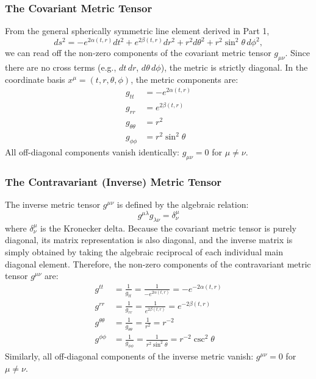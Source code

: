 \documentclass[11pt, a4paper]{report}
\begin{document}
\subsubsection*{The Covariant Metric Tensor}
From the general spherically symmetric line element derived in Part 1,
\begin{equation}
    ds^2 = -e^{2\alpha(t,r)} dt^2 + e^{2\beta(t,r)} dr^2 + r^2 d\theta^2 + r^2 \sin^2\theta \, d\phi^2,
\end{equation}
we can read off the non-zero components of the covariant metric tensor $g_{\mu\nu}$. Since there are no cross terms (e.g., $dt \, dr$, $d\theta \, d\phi$), the metric is strictly diagonal. In the coordinate basis $x^\mu = (t, r, \theta, \phi)$, the metric components are:
\begin{align}
    g_{tt} &= -e^{2\alpha(t,r)} \\
    g_{rr} &= e^{2\beta(t,r)} \\
    g_{\theta\theta} &= r^2 \\
    g_{\phi\phi} &= r^2 \sin^2\theta
\end{align}
All off-diagonal components vanish identically: $g_{\mu\nu} = 0$ for $\mu \neq \nu$.

\subsubsection*{The Contravariant (Inverse) Metric Tensor}
The inverse metric tensor $g^{\mu\nu}$ is defined by the algebraic relation:
\begin{equation}
    g^{\mu\lambda} g_{\lambda\nu} = \delta^\mu_\nu
\end{equation}
where $\delta^\mu_\nu$ is the Kronecker delta. Because the covariant metric tensor is purely diagonal, its matrix representation is also diagonal, and the inverse matrix is simply obtained by taking the algebraic reciprocal of each individual main diagonal element. Therefore, the non-zero components of the contravariant metric tensor $g^{\mu\nu}$ are:
\begin{align}
    g^{tt} &= \frac{1}{g_{tt}} = \frac{1}{-e^{2\alpha(t,r)}} = -e^{-2\alpha(t,r)} \\
    g^{rr} &= \frac{1}{g_{rr}} = \frac{1}{e^{2\beta(t,r)}} = e^{-2\beta(t,r)} \\
    g^{\theta\theta} &= \frac{1}{g_{\theta\theta}} = \frac{1}{r^2} = r^{-2} \\
    g^{\phi\phi} &= \frac{1}{g_{\phi\phi}} = \frac{1}{r^2 \sin^2\theta} = r^{-2} \csc^2\theta
\end{align}
Similarly, all off-diagonal components of the inverse metric vanish: $g^{\mu\nu} = 0$ for $\mu \neq \nu$.
\end{document}
